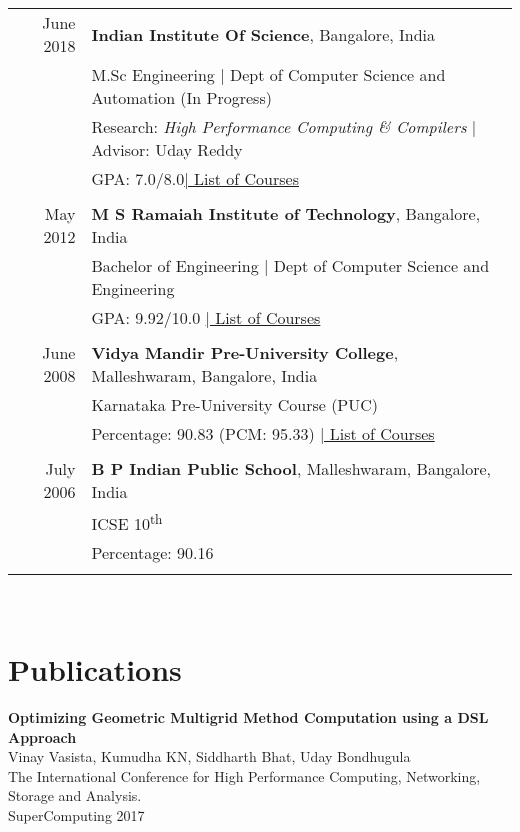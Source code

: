 \documentclass[a4paper,10pt]{article} %
\begin{document}
\begin{tabular}{rp{13cm}}
June 2018 & \textbf{Indian Institute Of Science}, Bangalore, India\\
& M.Sc Engineering | Dept of Computer Science and Automation (In Progress)\\
& Research: \small\emph{High Performance Computing \& Compilers} | Advisor: Uday Reddy\\
&\normalsize GPA: 7.0/8.0\hyperlink{iisc}{\hfill | \footnotesize List of Courses}\\
&\\


May 2012 & \textbf{M S Ramaiah Institute of Technology}, Bangalore, India\\
& Bachelor of Engineering | Dept of Computer Science and Engineering \\
&\normalsize GPA: 9.92/10.0 \hyperlink{msrit}{\hfill| \footnotesize List of Courses}\\
&\\


June 2008 & \textbf{Vidya Mandir Pre-University College}, Malleshwaram, Bangalore, India\\
& Karnataka Pre-University Course (PUC) \\
&\normalsize Percentage: 90.83 (PCM: 95.33) \hyperlink{hs}{\hfill| \footnotesize List of Courses}\\
&\\


July 2006 & \textbf{B P Indian Public School}, Malleshwaram, Bangalore, India\\
& ICSE 10\textsuperscript{th} \\
&\normalsize Percentage: 90.16 \\
&\\
\end{tabular}
\\
\section{Publications}
\textbf{Optimizing Geometric Multigrid Method Computation using a DSL Approach}\\
\small{Vinay Vasista, Kumudha KN, Siddharth Bhat, Uday Bondhugula} \\
\small{The International Conference for High Performance Computing, Networking, Storage and Analysis. \\ SuperComputing 2017} \\
\end{document}
